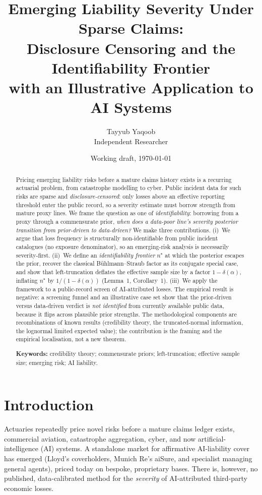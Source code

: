 \documentclass[11pt]{article}
\title{\textbf{Emerging Liability Severity Under Sparse Claims:\\
Disclosure Censoring and the Identifiability Frontier\\
with an Illustrative Application to AI Systems}}
\author{Tayyub Yaqoob\\\small Independent Researcher}
\date{Working draft, \today}
\begin{document}
\maketitle

\begin{abstract}
\noindent
Pricing emerging liability risks before a mature claims history exists is a recurring
actuarial problem, from catastrophe modelling to cyber. Public incident data for such risks
are sparse and \emph{disclosure-censored}: only losses above an effective reporting threshold
enter the public record, so a severity estimate must borrow strength from mature proxy lines.
We frame the question as one of \emph{identifiability}: borrowing from a proxy through a
commensurate prior, \emph{when does a data-poor line's severity posterior transition from
prior-driven to data-driven?} We make three contributions. (i)~We argue that loss frequency is
structurally non-identifiable from public incident catalogues (no exposure denominator), so an
emerging-risk analysis is necessarily severity-first. (ii)~We define an \emph{identifiability
frontier} $n^\star$ at which the posterior escapes the prior, recover the classical
B\"uhlmann--Straub factor as its conjugate special case, and show that left-truncation deflates
the effective sample size by a factor $1-\delta(\alpha)$, inflating $n^\star$ by
$1/(1-\delta(\alpha))$ (Lemma~1, Corollary~1). (iii)~We apply the framework to a public-record
screen of AI-attributed losses. The empirical result is negative: a screening funnel and an
illustrative case set show that the prior-driven versus data-driven verdict is \emph{not
identified} from currently available public data, because it flips across plausible prior
strengths. The methodological components are recombinations of known results (credibility theory,
the truncated-normal information, the lognormal limited expected value); the contribution is the
framing and the empirical localisation, not a new theorem.

\medskip\noindent\textbf{Keywords:} credibility theory; commensurate priors; left-truncation;
effective sample size; emerging risk; AI liability.
\end{abstract}

\section{Introduction}
Actuaries repeatedly price novel risks before a mature claims ledger exists, commercial
aviation, catastrophe aggregation, cyber, and now artificial-intelligence (AI) systems. A
standalone market for affirmative AI-liability cover has emerged (Lloyd's coverholders, Munich
Re's aiSure, and specialist managing general agents), priced today on bespoke, proprietary
bases. There is, however, no published, data-calibrated method for the
\emph{severity} of AI-attributed third-party economic losses.
\end{document}
